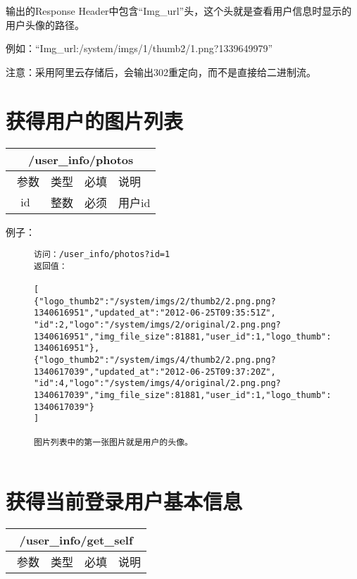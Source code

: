 \documentclass[cs4size]{ctexartutf8}
\begin{document}
输出的Response Header中包含“Img\_url”头，这个头就是查看用户信息时显示的用户头像的路径。

例如：“Img\_url:/system/imgs/1/thumb2/1.png?1339649979”

注意：采用阿里云存储后，会输出302重定向，而不是直接给二进制流。


\section{获得用户的图片列表}

\begin{table}[H]
   \begin{center}
\begin{tabular}{|c|c|c|p{12cm}|}
\hline
\multicolumn{4}{|c|}{/user\_info/photos} \\
\hline\hline
 \  参数  & 类型 & 必填 &  说明  \\
\hline
 id  & 整数 & 必须 &  用户id\\
\hline
\end{tabular}
   \end{center}
\end{table}


例子：

\begin{figure}[H]
\begin{verbatim}
访问：/user_info/photos?id=1
返回值：

[
{"logo_thumb2":"/system/imgs/2/thumb2/2.png.png?1340616951","updated_at":"2012-06-25T09:35:51Z",
"id":2,"logo":"/system/imgs/2/original/2.png.png?1340616951","img_file_size":81881,"user_id":1,"logo_thumb":"/system/imgs/2/thumb/2.png.png?1340616951"},
{"logo_thumb2":"/system/imgs/4/thumb2/2.png.png?1340617039","updated_at":"2012-06-25T09:37:20Z",
"id":4,"logo":"/system/imgs/4/original/2.png.png?1340617039","img_file_size":81881,"user_id":1,"logo_thumb":"/system/imgs/4/thumb/2.png.png?1340617039"}
]

图片列表中的第一张图片就是用户的头像。


\end{verbatim}
\end{figure}



\section{获得当前登录用户基本信息}

\begin{table}[H]
   \begin{center}
\begin{tabular}{|c|c|c|p{12cm}|}
\hline
\multicolumn{4}{|c|}{/user\_info/get\_self} \\
\hline\hline
 \  参数  & 类型 & 必填 &  说明  \\
\hline
\end{tabular}
   \end{center}
\end{table}
\end{document}
